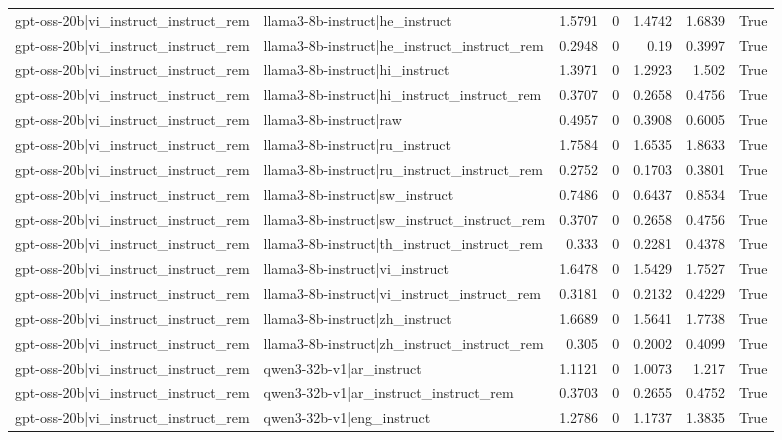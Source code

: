 \begin{table}
\begin{tabular}{l l r r r r l}
gpt-oss-20b|vi_instruct_instruct_rem & llama3-8b-instruct|he_instruct & 1.5791 & 0 & 1.4742 & 1.6839 & True \\
gpt-oss-20b|vi_instruct_instruct_rem & llama3-8b-instruct|he_instruct_instruct_rem & 0.2948 & 0 & 0.19 & 0.3997 & True \\
gpt-oss-20b|vi_instruct_instruct_rem & llama3-8b-instruct|hi_instruct & 1.3971 & 0 & 1.2923 & 1.502 & True \\
gpt-oss-20b|vi_instruct_instruct_rem & llama3-8b-instruct|hi_instruct_instruct_rem & 0.3707 & 0 & 0.2658 & 0.4756 & True \\
gpt-oss-20b|vi_instruct_instruct_rem & llama3-8b-instruct|raw & 0.4957 & 0 & 0.3908 & 0.6005 & True \\
gpt-oss-20b|vi_instruct_instruct_rem & llama3-8b-instruct|ru_instruct & 1.7584 & 0 & 1.6535 & 1.8633 & True \\
gpt-oss-20b|vi_instruct_instruct_rem & llama3-8b-instruct|ru_instruct_instruct_rem & 0.2752 & 0 & 0.1703 & 0.3801 & True \\
gpt-oss-20b|vi_instruct_instruct_rem & llama3-8b-instruct|sw_instruct & 0.7486 & 0 & 0.6437 & 0.8534 & True \\
gpt-oss-20b|vi_instruct_instruct_rem & llama3-8b-instruct|sw_instruct_instruct_rem & 0.3707 & 0 & 0.2658 & 0.4756 & True \\
gpt-oss-20b|vi_instruct_instruct_rem & llama3-8b-instruct|th_instruct_instruct_rem & 0.333 & 0 & 0.2281 & 0.4378 & True \\
gpt-oss-20b|vi_instruct_instruct_rem & llama3-8b-instruct|vi_instruct & 1.6478 & 0 & 1.5429 & 1.7527 & True \\
gpt-oss-20b|vi_instruct_instruct_rem & llama3-8b-instruct|vi_instruct_instruct_rem & 0.3181 & 0 & 0.2132 & 0.4229 & True \\
gpt-oss-20b|vi_instruct_instruct_rem & llama3-8b-instruct|zh_instruct & 1.6689 & 0 & 1.5641 & 1.7738 & True \\
gpt-oss-20b|vi_instruct_instruct_rem & llama3-8b-instruct|zh_instruct_instruct_rem & 0.305 & 0 & 0.2002 & 0.4099 & True \\
gpt-oss-20b|vi_instruct_instruct_rem & qwen3-32b-v1|ar_instruct & 1.1121 & 0 & 1.0073 & 1.217 & True \\
gpt-oss-20b|vi_instruct_instruct_rem & qwen3-32b-v1|ar_instruct_instruct_rem & 0.3703 & 0 & 0.2655 & 0.4752 & True \\
gpt-oss-20b|vi_instruct_instruct_rem & qwen3-32b-v1|eng_instruct & 1.2786 & 0 & 1.1737 & 1.3835 & True \\

\end{tabular}
\end{table}

